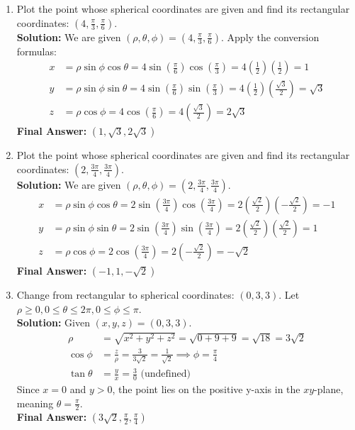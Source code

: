 \documentclass[11pt]{article}
\begin{document}
\begin{enumerate}[label=\textbf{\arabic*.}]

\item Plot the point whose spherical coordinates are given and find its rectangular coordinates: $(4, \frac{\pi}{3}, \frac{\pi}{6})$.\\
\textbf{Solution:} We are given $(\rho, \theta, \phi) = (4, \frac{\pi}{3}, \frac{\pi}{6})$. Apply the conversion formulas:
\begin{align*}
x &= \rho \sin\phi \cos\theta = 4 \sin\left(\frac{\pi}{6}\right) \cos\left(\frac{\pi}{3}\right) = 4 \left(\frac{1}{2}\right) \left(\frac{1}{2}\right) = 1 \\
y &= \rho \sin\phi \sin\theta = 4 \sin\left(\frac{\pi}{6}\right) \sin\left(\frac{\pi}{3}\right) = 4 \left(\frac{1}{2}\right) \left(\frac{\sqrt{3}}{2}\right) = \sqrt{3} \\
z &= \rho \cos\phi = 4 \cos\left(\frac{\pi}{6}\right) = 4 \left(\frac{\sqrt{3}}{2}\right) = 2\sqrt{3}
\end{align*}
\textbf{Final Answer:} $(1, \sqrt{3}, 2\sqrt{3})$

\item Plot the point whose spherical coordinates are given and find its rectangular coordinates: $(2, \frac{3\pi}{4}, \frac{3\pi}{4})$.\\
\textbf{Solution:} We are given $(\rho, \theta, \phi) = (2, \frac{3\pi}{4}, \frac{3\pi}{4})$.
\begin{align*}
x &= \rho \sin\phi \cos\theta = 2 \sin\left(\frac{3\pi}{4}\right) \cos\left(\frac{3\pi}{4}\right) = 2 \left(\frac{\sqrt{2}}{2}\right) \left(-\frac{\sqrt{2}}{2}\right) = -1 \\
y &= \rho \sin\phi \sin\theta = 2 \sin\left(\frac{3\pi}{4}\right) \sin\left(\frac{3\pi}{4}\right) = 2 \left(\frac{\sqrt{2}}{2}\right) \left(\frac{\sqrt{2}}{2}\right) = 1 \\
z &= \rho \cos\phi = 2 \cos\left(\frac{3\pi}{4}\right) = 2 \left(-\frac{\sqrt{2}}{2}\right) = -\sqrt{2}
\end{align*}
\textbf{Final Answer:} $(-1, 1, -\sqrt{2})$

\item Change from rectangular to spherical coordinates: $(0, 3, 3)$. Let $\rho \geq 0, 0 \le \theta \le 2\pi, 0 \le \phi \le \pi$.\\
\textbf{Solution:} Given $(x, y, z) = (0, 3, 3)$.
\begin{align*}
\rho &= \sqrt{x^2+y^2+z^2} = \sqrt{0 + 9 + 9} = \sqrt{18} = 3\sqrt{2} \\
\cos\phi &= \frac{z}{\rho} = \frac{3}{3\sqrt{2}} = \frac{1}{\sqrt{2}} \implies \phi = \frac{\pi}{4} \\
\tan\theta &= \frac{y}{x} = \frac{3}{0} \text{ (undefined)}
\end{align*}
Since $x=0$ and $y>0$, the point lies on the positive y-axis in the $xy$-plane, meaning $\theta = \frac{\pi}{2}$.\\
\textbf{Final Answer:} $(3\sqrt{2}, \frac{\pi}{2}, \frac{\pi}{4})$


\end{enumerate}
\end{document}
